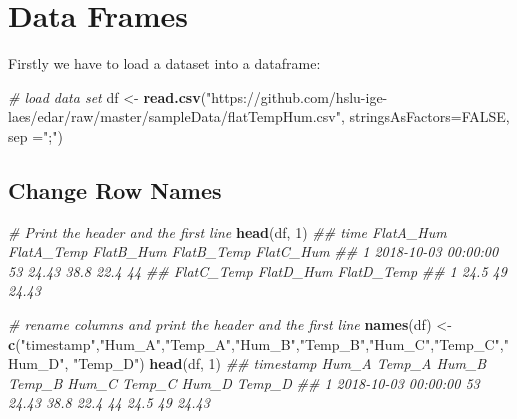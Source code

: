 \documentclass[
]{book}
\newenvironment{Shaded}{\begin{snugshade}}{\end{snugshade}}
\newcommand{\CommentTok}[1]{\textcolor[rgb]{0.56,0.35,0.01}{\textit{#1}}}
\newcommand{\DataTypeTok}[1]{\textcolor[rgb]{0.13,0.29,0.53}{#1}}
\newcommand{\DecValTok}[1]{\textcolor[rgb]{0.00,0.00,0.81}{#1}}
\newcommand{\KeywordTok}[1]{\textcolor[rgb]{0.13,0.29,0.53}{\textbf{#1}}}
\newcommand{\NormalTok}[1]{#1}
\newcommand{\OtherTok}[1]{\textcolor[rgb]{0.56,0.35,0.01}{#1}}
\newcommand{\StringTok}[1]{\textcolor[rgb]{0.31,0.60,0.02}{#1}}
\begin{document}
\hypertarget{data-frames}{%
\section{Data Frames}\label{data-frames}}

Firstly we have to load a dataset into a dataframe:

\begin{Shaded}
\begin{Highlighting}[]

\CommentTok{# load data set}
\NormalTok{df <-}\StringTok{ }\KeywordTok{read.csv}\NormalTok{(}\StringTok{"https://github.com/hslu-ige-laes/edar/raw/master/sampleData/flatTempHum.csv"}\NormalTok{,}
               \DataTypeTok{stringsAsFactors=}\OtherTok{FALSE}\NormalTok{, }\DataTypeTok{sep =}\StringTok{";"}\NormalTok{)}
\end{Highlighting}
\end{Shaded}

\hypertarget{change-row-names}{%
\subsection{Change Row Names}\label{change-row-names}}

\begin{Shaded}
\begin{Highlighting}[]
\CommentTok{# Print the header and the first line}
\KeywordTok{head}\NormalTok{(df, }\DecValTok{1}\NormalTok{)}
\CommentTok{##                  time FlatA_Hum FlatA_Temp FlatB_Hum FlatB_Temp FlatC_Hum}
\CommentTok{## 1 2018-10-03 00:00:00        53      24.43      38.8       22.4        44}
\CommentTok{##   FlatC_Temp FlatD_Hum FlatD_Temp}
\CommentTok{## 1       24.5        49      24.43}

\CommentTok{# rename columns and print the header and the first line}
\KeywordTok{names}\NormalTok{(df) <-}\StringTok{ }\KeywordTok{c}\NormalTok{(}\StringTok{"timestamp"}\NormalTok{,}\StringTok{"Hum_A"}\NormalTok{,}\StringTok{"Temp_A"}\NormalTok{,}\StringTok{"Hum_B"}\NormalTok{,}\StringTok{"Temp_B"}\NormalTok{,}\StringTok{"Hum_C"}\NormalTok{,}\StringTok{"Temp_C"}\NormalTok{,}\StringTok{"Hum_D"}\NormalTok{, }\StringTok{"Temp_D"}\NormalTok{)}
\KeywordTok{head}\NormalTok{(df, }\DecValTok{1}\NormalTok{)}
\CommentTok{##             timestamp Hum_A Temp_A Hum_B Temp_B Hum_C Temp_C Hum_D Temp_D}
\CommentTok{## 1 2018-10-03 00:00:00    53  24.43  38.8   22.4    44   24.5    49  24.43}
\end{Highlighting}
\end{Shaded}
\end{document}
